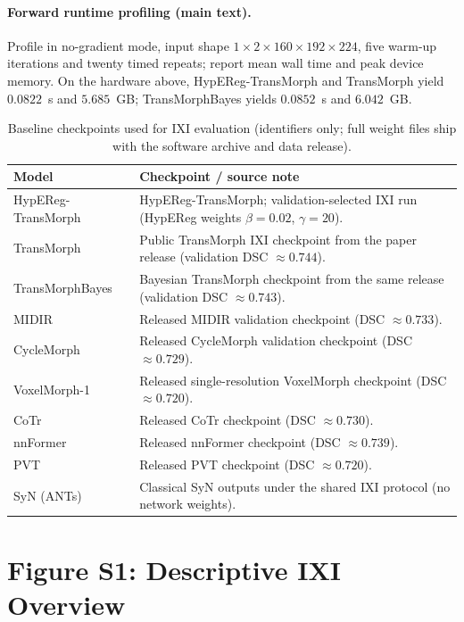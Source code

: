 \documentclass[11pt,a4paper]{article}
\begin{document}
\paragraph{Forward runtime profiling (main text).}
Profile in no-gradient mode, input shape \(1\times2\times160\times192\times224\), five warm-up iterations and twenty timed repeats; report mean wall time and peak device memory. On the hardware above, HypEReg-TransMorph and TransMorph yield \(0.0822\)~s and \(5.685\)~GB; TransMorphBayes yields \(0.0852\)~s and \(6.042\)~GB.

\begin{table}[H]
\caption{Baseline checkpoints used for IXI evaluation (identifiers only; full weight files ship with the software archive and data release).\label{tab:s2b_provenance}}
\scriptsize
\setlength{\tabcolsep}{4pt}
\renewcommand{\arraystretch}{1.1}
\begin{tabularx}{\textwidth}{lX}
\toprule
\textbf{Model} & \textbf{Checkpoint / source note} \\
\midrule
HypEReg-TransMorph & HypEReg-TransMorph; validation-selected IXI run (HypEReg weights \(\beta{=}0.02\), \(\gamma{=}20\)). \\
TransMorph & Public TransMorph IXI checkpoint from the paper release (validation DSC \(\approx 0.744\)). \\
TransMorphBayes & Bayesian TransMorph checkpoint from the same release (validation DSC \(\approx 0.743\)). \\
MIDIR & Released MIDIR validation checkpoint (DSC \(\approx 0.733\)). \\
CycleMorph & Released CycleMorph validation checkpoint (DSC \(\approx 0.729\)). \\
VoxelMorph-1 & Released single-resolution VoxelMorph checkpoint (DSC \(\approx 0.720\)). \\
CoTr & Released CoTr checkpoint (DSC \(\approx 0.730\)). \\
nnFormer & Released nnFormer checkpoint (DSC \(\approx 0.739\)). \\
PVT & Released PVT checkpoint (DSC \(\approx 0.720\)). \\
SyN (ANTs) & Classical SyN outputs under the shared IXI protocol (no network weights). \\
\bottomrule
\end{tabularx}
\end{table}

\section{Figure S1: Descriptive IXI Overview}
\end{document}
